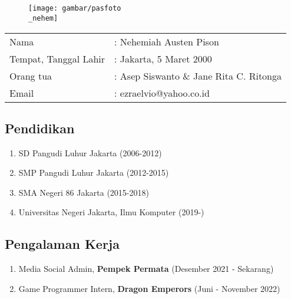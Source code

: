 \chapter*{}

\begin{figure}[H]
\centering
\texttt{[image: gambar/pasfoto\\\_nehem]}
\end{figure}

\noindent
\begin{tabular}{ll}
Nama & : Nehemiah Austen Pison \\
Tempat, Tanggal Lahir & : Jakarta, 5 Maret 2000 \\
Orang tua & : Asep Siswanto \& Jane Rita C. Ritonga \\
Email & : ezraelvio@yahoo.co.id
\end{tabular}

\section*{Pendidikan}
\begin{enumerate}
    \itemsep0em 
    \item SD Pangudi Luhur Jakarta (2006-2012)
    \item SMP Pangudi Luhur Jakarta (2012-2015)
    \item SMA Negeri 86 Jakarta (2015-2018)
    \item Universitas Negeri Jakarta, Ilmu Komputer (2019-)
\end{enumerate}

\section*{Pengalaman Kerja}
\begin{enumerate}
    \itemsep0em 
    \item Media Social Admin, \textbf{Pempek Permata} (Desember 2021 - Sekarang)
    \item Game Programmer Intern, \textbf{Dragon Emperors} (Juni - November 2022)
\end{enumerate}